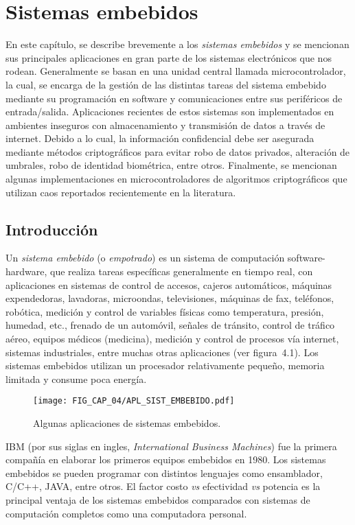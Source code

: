 
\chapter{Sistemas embebidos}
En este capítulo, se describe brevemente a los \textit{sistemas embebidos} y se mencionan sus principales aplicaciones en gran parte de los sistemas electrónicos que nos rodean. Generalmente se basan en una unidad central llamada microcontrolador, la cual, se encarga de la gestión de las distintas tareas del sistema embebido mediante su programación en software y comunicaciones entre sus periféricos de entrada/salida. Aplicaciones recientes de estos sistemas son implementados en ambientes inseguros con almacenamiento y transmisión de datos a través de internet. Debido a lo cual, la información confidencial debe ser asegurada mediante métodos criptográficos para evitar robo de datos privados, alteración de umbrales, robo de identidad biométrica, entre otros. Finalmente, se mencionan algunas implementaciones en microcontroladores de algoritmos criptográficos que utilizan caos reportados recientemente en la literatura. 

\section{Introducción}
Un \textit{sistema embebido} (o \textit{empotrado}) es un sistema de computación software-hardware, que realiza tareas específicas generalmente en tiempo real, con aplicaciones en sistemas de control de accesos, cajeros automáticos, máquinas expendedoras, lavadoras, microondas, televisiones, máquinas de fax, teléfonos, robótica, medición y control de variables físicas como temperatura, presión, humedad, etc., frenado de un automóvil, señales de tránsito, control de tráfico aéreo, equipos médicos (medicina), medición y control de procesos vía internet, sistemas industriales, entre muchas otras aplicaciones (ver figura~4.1). Los sistemas embebidos utilizan un procesador relativamente pequeño, memoria limitada y consume poca energía.  \\

\begin{figure}[!htbp] %
	\center
	\texttt{[image: FIG\_CAP\_04/APL\_SIST\_EMBEBIDO.pdf]}   
	\caption{Algunas aplicaciones de sistemas embebidos.}
\end{figure} 

IBM (por sus siglas en ingles, \textit{International Business Machines}) fue la primera compañía en elaborar los primeros equipos embebidos en 1980. Los sistemas embebidos se pueden programar con distintos lenguajes como ensamblador, C/C++, JAVA, entre otros. El factor costo \textit{vs} efectividad \textit{vs} potencia es la principal ventaja de los sistemas embebidos comparados con sistemas de computación completos como una computadora personal. \\

